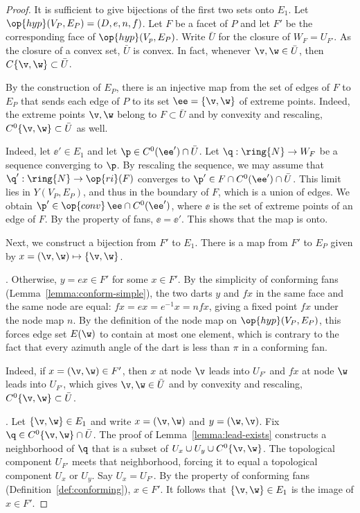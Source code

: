 \begin{proof}
  It is sufficient to give bijections of the first two sets onto
  $E_1$.  Let $\op{hyp}(V_P,E_P) = (D,e,n,f)$.  Let $F$ be a facet of
  $P$ and let $F'$ be the corresponding face of
  $\op{hyp}(V_p,E_P)$. Write $\bar U$ for the closure of
  $W_{F}=U_{F'}$.  As the closure of a convex set, $\bar U$ is convex.
  In fact, whenever $\v,\w\in \bar U$, then $C\{\v,\w\}\subset \bar
  U$.

  By the construction of $E_P$, there is an injective map from the set
  of edges of $F$ to $E_P$ that sends each edge of $P$ to its set
  $\ee =\{\v,\w\}$ of extreme points.    Indeed, the extreme points 
  $\v,\w$ belong to $F\subset\bar U$ and by convexity and rescaling,
  $C^0\{\v,\w\}\subset\bar U$ as well.

    Indeed, let
  $\ee'\in E_1$ and let $\p\in C^0(\ee')\cap\bar U$.  Let
  $\q:\ring{N}\to W_{F}$ be a sequence converging to $\p$.  By
  rescaling the sequence, we may assume that $\q':\ring{N}\to
  \op{ri}(F)$ converges to $\p' \in F \cap C^0(\ee')\cap \bar U$.
  This limit lies in $Y(V_P,E_P)$, and thus in the boundary of $F$,
  which is a union of edges.  We obtain $\p' \in\op{conv}\,\ee\cap
  C^0(\ee')$, where $\ee$ is the set of extreme points of an edge of
  $F$.  By the {} property of fans, $\ee = \ee'$.
  This shows that the map is onto.

  Next, we construct a bijection from $F'$ to $E_1$.  There is a map
  from $F'$ to $E_P$ given by $x = (\v,\w) \mapsto \{\v,\w\}$. 

  .  Otherwise, $y = e x\in F'$ for some
  $x\in F'$.  By the simplicity of conforming fans
  (Lemma~\ref{lemma:conform-simple}), the two darts $y$ and $f x$ in
  the same face and the same node are equal: $f x = e x = e^{-1} x = n
  f x$, giving a fixed point $f x$ under the node map $n$.  By the
  definition of the node map on $\op{hyp}(V_P,E_P)$, this forces edge
  set $E(\w)$ to contain at most one element, which is contrary to the
  fact that every azimuth angle of the dart is less than $\pi$ in a
  conforming fan.

    Indeed, if $x=(\v,\w)\in F'$,
  then $x$ at node $\v$ leads into $U_{F'}$ and $f x$ at node $\w$ leads
  into $U_{F'}$, which gives $\v,\w\in \bar U$ and by convexity and rescaling, 
  $C^0\{\v,\w\}\subset \bar U$.

  .
  Let $\{\v,\w\}\in E_1$ and write $x = (\v,\w)$ and $y = (\w,\v)$.
  Fix $\q\in C^0\{\v,\w\}\cap \bar U$.  The proof of
  Lemma~\ref{lemma:lead-exists} constructs a neighborhood of $\q$ that
  is a subset of $U_x\cup U_y\cup C^0\{\v,\w\}$.  The topological
  component $U_{F'}$ meets that neighborhood, forcing it to equal a
  topological component $U_x$ or $U_y$.  Say $U_x = U_{F'}$.  By the
  property  of conforming fans
  (Definition~\ref{def:conforming}), $x\in F'$. It follows that
  $\{\v,\w\}\in E_1$ is the image of $x\in F'$.
\end{proof}



